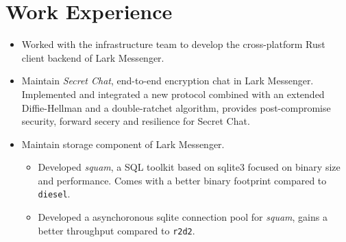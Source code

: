 \documentclass{resume}
\newcommand{\en}[1]{#1}
\newcommand{\zh}[1]{}
\begin{document}
\section{\en{Work Experience}\zh{工作经历}}
\en{}
\zh{\datedsubsection{\textbf{\href{https://www.bytedance.com/}{字节跳动}}}{09/2021 -- 至今}}
\en{}
\zh{\role{飞书跨平台基础架构}{Rust 研发实习}}
\begin{itemize}
      \item \en{
                Worked with the infrastructure team to develop the cross-platform 
                Rust client backend of Lark Messenger.
            }
            \zh{合作开发飞书客户端的跨平台 Rust SDK。}
      \item \en{
                Maintain \textit{Secret Chat}, end-to-end encryption chat in Lark Messenger.
                Implemented and integrated a new protocol combined with an extended 
                Diffie-Hellman and a double-ratchet algorithm, provides post-compromise 
                security, forward secery and resilience for Secret Chat.}
            \zh{
                维护飞书端到端加密聊天功能 “密聊”。实现并集成了一套新加密协议，通过结合扩展的 
                Diffie-Hellman 算法以及双棘轮算法，保证了聊天的后向安全性、前向安全性以及抵抗重放攻击的能力。
            }
      \item \en{
                Maintain storage component of Lark Messenger.
            }
            \zh{
                维护飞书 SDK 的存储组件。
            }
      \begin{itemize}
                  \item \en{
                            Developed \textit{squam}, a SQL toolkit based on sqlite3 focused on binary size and performance.
                            Comes with a better binary footprint compared to \texttt{diesel}.
                        }
                        \zh{
                            开发了 \textit{squam}，一个基于 sqlite3 的 SQL 工具库，专注于二进制大小和性能。在测试中，相较于 \texttt{diesel}，\textit{squam} 的二进制体积更小，编译时间更短。
                        }
                  \item \en{
                            Developed a asynchoronous sqlite connection pool for \textit{squam}, gains a better throughput compared to \texttt{r2d2}.
                        }
                        \zh{
                            为 \textit{squam} 开发了一个异步的 sqlite 连接池，相较于 \texttt{r2d2}，\texttt{squam} 的吞吐量更高。
}
\end{itemize}
\end{itemize}
\end{document}

